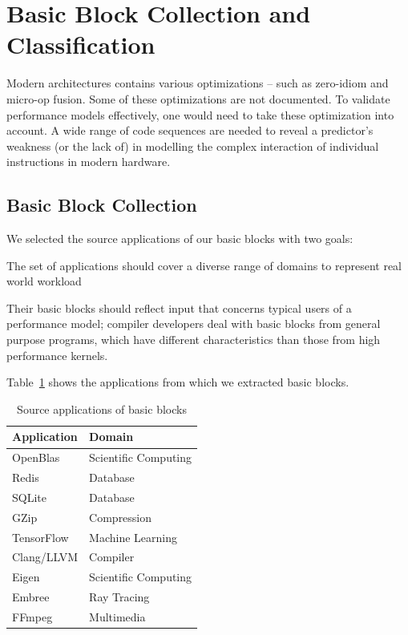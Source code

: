 \section{Basic Block Collection and Classification}
Modern architectures contains various optimizations --
such as zero-idiom and micro-op fusion.
Some of these optimizations are not documented.
To validate performance models effectively, one would need to take 
these optimization into account.
A wide range of code sequences are needed to reveal a predictor's 
weakness (or the lack of) in modelling the complex interaction of 
individual instructions in modern hardware.
    
\subsection{Basic Block Collection}
We selected the source applications of our basic blocks with two goals:
\begin{enumerate*}
    \item The set of applications should cover a diverse range
of domains to represent real world workload
    \item Their basic blocks should reflect input that concerns typical users of a performance model;
    compiler developers deal with
    basic blocks from general purpose programs,
    which have different characteristics
    than those from 
    high performance kernels. 
\end{enumerate*}
Table~\ref{tab:apps} shows the applications from which we extracted basic blocks.

\begin{table}
\begin{tabular}{|p{}|p{}|}
\hline
Application & Domain \\

\hline
OpenBlas & Scientific Computing \\

\hline
Redis & Database \\

\hline
SQLite & Database \\

\hline
GZip & Compression \\

\hline
TensorFlow & Machine Learning \\

\hline 
Clang/LLVM & Compiler \\

\hline
Eigen & Scientific Computing \\

\hline
Embree & Ray Tracing\\

\hline
FFmpeg & Multimedia\\
\hline
\end{tabular}
\\
\caption{Source applications of basic blocks}
\label{tab:apps}
\end{table}

